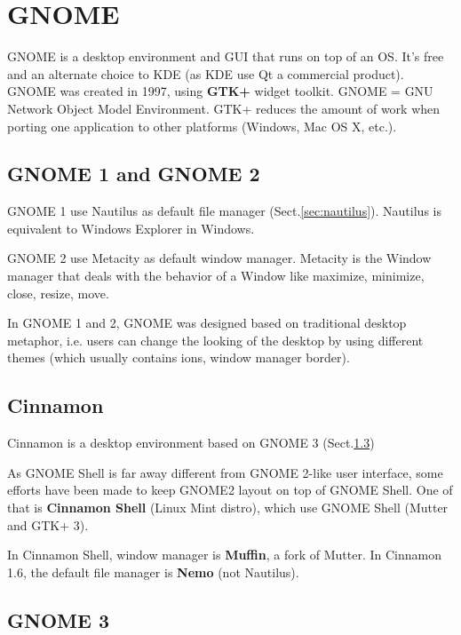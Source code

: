 \chapter{GNOME}
\label{sec:GNOME}
\label{chap:GNOME}

GNOME is a desktop environment and GUI that runs on top of an OS. It's free and
an alternate choice to KDE (as KDE use Qt a commercial product). GNOME was
created in 1997, using {\bf GTK+} widget toolkit.  GNOME = GNU Network Object
Model Environment. GTK+ reduces the amount of work when porting one application
to other platforms (Windows, Mac OS X, etc.).


\section{GNOME 1 and GNOME 2}
\label{sec:GNOME-1}
\label{sec:GNOME-2}

GNOME 1 use Nautilus as default file manager (Sect.\ref{sec:nautilus}).
Nautilus is  equivalent to Windows Explorer in Windows.

GNOME 2 use Metacity as default window manager.
Metacity is the Window manager that deals with the behavior of a Window like
maximize, minimize, close, resize, move.

In GNOME 1 and 2, GNOME was designed based on traditional desktop metaphor, i.e.
users can change the looking of the desktop by using different themes (which
usually contains ions, window manager border). 



\section{Cinnamon}
\label{sec:Cinnamon}

Cinnamon is a desktop environment based on GNOME 3 (Sect.\ref{sec:GNOME-3})

As GNOME Shell is far away different from GNOME 2-like user interface, some
efforts have been made to keep GNOME2 layout on top of GNOME Shell. One of that
is {\bf Cinnamon Shell} (Linux Mint distro), which use GNOME Shell (Mutter and
GTK+ 3).

In Cinnamon Shell, window manager is {\bf Muffin}, a fork of Mutter. In Cinnamon
1.6, the default file manager is {\bf Nemo} (not Nautilus).

\section{GNOME 3}
\label{sec:GNOME-3}

